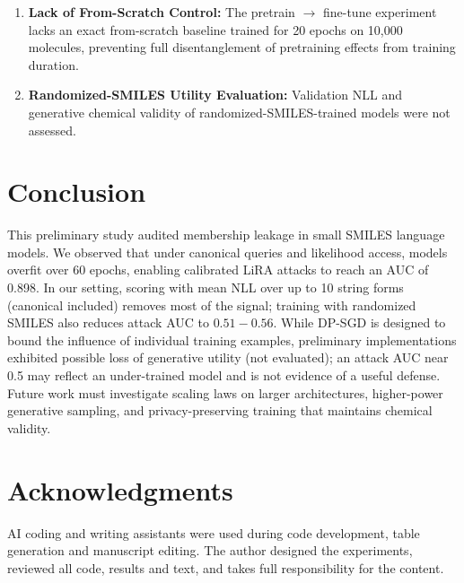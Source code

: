 \documentclass[10pt,journal,compsoc]{IEEEtran}
\begin{document}
\begin{enumerate}
    \item \textbf{Lack of From-Scratch Control:} The pretrain $\to$ fine-tune experiment lacks an exact from-scratch baseline trained for 20 epochs on 10,000 molecules, preventing full disentanglement of pretraining effects from training duration.
    \item \textbf{Randomized-SMILES Utility Evaluation:} Validation NLL and generative chemical validity of randomized-SMILES-trained models were not assessed.
\end{enumerate}

\section{Conclusion}
This preliminary study audited membership leakage in small SMILES language models. We observed that under canonical queries and likelihood access, models overfit over 60 epochs, enabling calibrated LiRA attacks to reach an AUC of 0.898. In our setting, scoring with mean NLL over up to 10 string forms (canonical included) removes most of the signal; training with randomized SMILES also reduces attack AUC to $0.51 - 0.56$. While DP-SGD is designed to bound the influence of individual training examples, preliminary implementations exhibited possible loss of generative utility (not evaluated); an attack AUC near 0.5 may reflect an under-trained model and is not evidence of a useful defense. Future work must investigate scaling laws on larger architectures, higher-power generative sampling, and privacy-preserving training that maintains chemical validity.

\section*{Acknowledgments}
AI coding and writing assistants were used during code development, table generation and manuscript editing. The author designed the experiments, reviewed all code, results and text, and takes full responsibility for the content.



\end{document}
